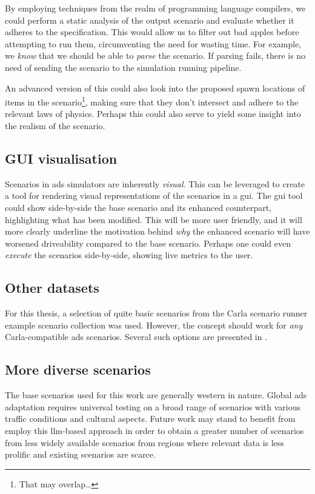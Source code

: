 By employing techniques from the realm of programming language compilers, we could perform a static
analysis of the output scenario and evaluate whether it adheres to the specification. This would
allow us to filter out bad apples before attempting to run them, circumventing the need for wasting
time.
For example, we \emph{know} that we should be able to \emph{parse} the scenario. If parsing
fails, there is no need of sending the scenario to the simulation running pipeline.

An advanced version of this could also look into the proposed spawn locations of items in the
scenario\footnote{That may overlap\ldots}, making sure that they don't intersect and adhere to the
relevant laws of physics. Perhaps this could also serve to yield some insight into the realism of
the scenario.

\subsection{GUI visualisation}

Scenarios in \acrshort{ads} simulators are inherently \emph{visual}. This can be leveraged to create
a tool for rendering visual representations of the scenarios in a \acrfull{gui}. The \acrshort{gui}
tool could show side-by-side the base scenario and its enhanced counterpart, highlighting what has
been modified.
This will be more user friendly, and it will more clearly underline the motivation behind \emph{why}
the enhanced scenario will have worsened driveability compared to the base scenario.
Perhaps one could even \emph{execute} the scenarios side-by-side, showing live metrics to the user.

\subsection{Other datasets}

For this thesis, a selection of quite basic scenarios from the Carla scenario runner example
scenario collection was used. However, the concept should work for \emph{any} Carla-compatible
\acrshort{ads} scenarios. Several such options are presented in .

\subsection{More diverse scenarios}
The base scenarios used for this work are generally western in nature. Global \acrshort{ads} adaptation
requires universal testing on a broad range of scenarios with various traffic conditions and cultural
aspects. Future work may stand to benefit from employ this \acrshort{llm}-based approach in order
to obtain a greater number of scenarios from less widely available scenarios from regions where
relevant data is less prolific and existing scenarios are scarce.

